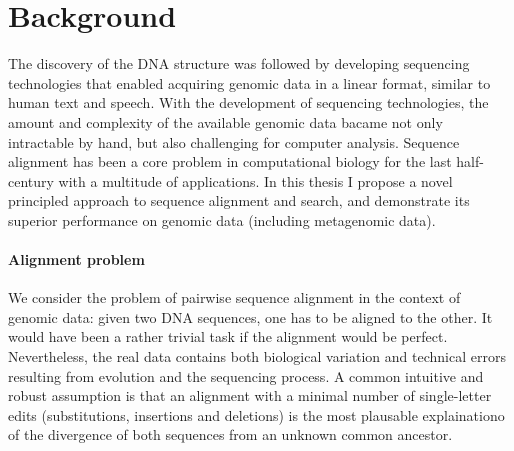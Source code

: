 \section*{Background}

The discovery of the DNA structure\citep{watson1953structure} was followed by
developing sequencing technologies that enabled acquiring genomic data in a
linear format, similar to human text and speech. With the development of
sequencing technologies, the amount and complexity of the available genomic data
bacame not only intractable by hand, but also challenging for computer analysis.
Sequence alignment has been a core problem in computational biology for the last
half-century with a multitude of applications. In this thesis I propose a novel
principled approach to sequence alignment and search, and demonstrate its
superior performance on genomic data (including metagenomic data).

\paragraph{Alignment problem}
We consider the problem of pairwise sequence alignment in the context of genomic
data: given two DNA sequences, one has to be aligned to the other. It would have
been a rather trivial task if the alignment would be perfect. Nevertheless, the
real data contains both biological variation and technical errors resulting from
evolution and the sequencing process. A common intuitive and robust assumption
is that an alignment with a minimal number of single-letter edits
(substitutions, insertions and deletions) is the most plausable explainationo of
the divergence of both sequences from an unknown common ancestor.

